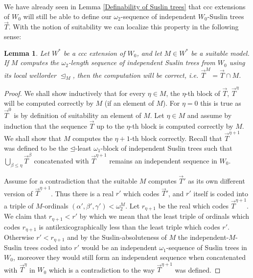 \documentclass[a4paper,11pt]{article}
\newtheorem{lemma}[theorem]{Lemma}
\begin{document}
We have already seen in Lemma \ref{Definability of Suslin trees} that ccc extensions of $W_0$ will still be able to define our
$\omega_2$-sequence of independent $W_0$-Suslin trees $\vec{T}$. With the notion of suitability
we can localize this property in the following sense:
\begin{lemma}
 Let $W^{\ast}$ be a ccc extension of $W_0$, and let $M \in W^{\ast}$ be a suitable model.
 If $M$ computes the $\omega_2$-length sequence of independent Suslin trees from $W_0$ using its local wellorder $\unlhd_M$,
 then the computation will be correct, i.e. $\vec{T}^M = \vec{T} \cap M$.
\end{lemma}
\begin{proof}
 We shall show inductively that for every $\eta \in M$, the $\eta$-th
 block of $\vec{T}$, $\vec{T}^{\eta}$ will be computed correctly by $M$ (if an element of $M$).
 For $\eta=0$ this is true as $\vec{T}^0$ is by definition of suitability an element of $M$.
 Let $\eta \in M$ and assume by induction that the sequence $\vec{T}$ up to the $\eta$-th block is computed correctly by $M$. We shall show that $M$ computes the $\eta+1$-th block correctly. Recall that $\vec{T}^{\eta+1}$ was defined to be the $\unlhd$-least $\omega_1$-block of independent Suslin trees such that $\bigcup_{\beta \le\eta} \vec{T}^{\beta}$ concatenated with $\vec{T}^{\eta+1}$ remains an independent sequence in $W_0$. 
 
 Assume for a contradiction that the suitable $M$ computes $\vec{T}'$ as its own different version of $\vec{T}^{\eta+1}$. Thus there is a real
 $r'$ which codes $\vec{T}'$, and $r'$ itself is coded into a triple of $M$-ordinals $(\alpha', \beta', \gamma')< \omega_2^{M}$. Let $r_{\eta+1}$ be the real which codes $\vec{T}^{\eta+1}$.
 We claim that $r_{\eta+1} < r'$ by which we mean that the least triple of ordinals which codes $r_{\eta+1}$ is antilexicographically less than the least triple which codes $r'$. Otherwise $r'< r_{\eta+1}$ and by the Suslin-absoluteness of $M$
 the independent-$M$-Suslin trees coded into $r'$ would be an independent $\omega_1$-sequence of Suslin trees in $W_0$,
 moreover they would still form an independent sequence when concatenated with $\vec{T}^{\eta}$ in $W_0$ which
 is a contradiction to the way $\vec{T}^{\eta+1}$ was defined.
 

\end{proof}
\end{document}
